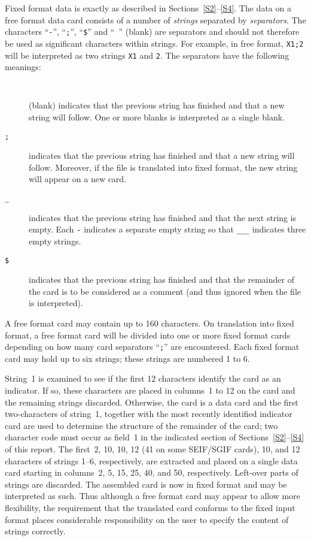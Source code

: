 \documentclass[a4paper]{article}
\newcommand{\itt}[1]{\item[\tt #1]}
\begin{document}
Fixed    format      data     is   exactly     as         described in
Sections~\ref{S2}--\ref{S4}.   The  data  on a free   format data card
consists of  a number of {\em  strings} separated by {\em separators}.
The characters  ``{\tt   -}'',  ``{\tt ;}'', ``{\tt   \$}'' and  ``~''
(blank)
are separators and should not therefore be used as significant
characters  within strings.  For example,  in  free format, {\tt X1;2}
will be interpreted   as two  strings {\tt X1}    and   {\tt 2}.   The
separators have the following meanings:
\begin{description}
\itt{~}
(blank) indicates that the previous string has finished and that a new
string will follow. One or  more blanks  is interpreted   as a  single
blank.

\itt{;}
indicates that the previous string has finished and  that a new string
will follow. Moreover, if the  file is translated  into  fixed format,
the new string will appear on a new card.

\itt{\_}
indicates that the  previous string  has finished  and  that the  next
string is empty.  Each {\tt  -}  indicates a separate empty string so
that {\tt \_\_\_} indicates three empty strings.

\itt{\$}
indicates that the previous string has finished and that the remainder
of the card is  to be considered as  a comment (and thus  ignored when
the file is interpreted).
\end{description}

A free format
card
may contain  up to 160  characters.  On translation  into  fixed
format,
a free format card will be divided into one or more fixed format
cards depending on  how many  card  separators ``{\tt ;}''
are encountered.  Each fixed format card may  hold up  to six strings;
these strings are numbered 1 to 6.

String~1  is examined to  see if the first 12  characters identify the
card as an indicator. If so, these characters are  placed in columns~1
to 12 on the card and the remaining  strings discarded. Otherwise, the
card is a data card and the first two-characters of string~1, together
with the most recently identified indicator card are used to determine
the structure
of the remainder of  the card;
two  character  code
must   occur   as    field~1   in  the  indicated section    of
Sections~\ref{S2}--\ref{S4} of this  report.  The first~2, 10, 10,  12
(41 on some SEIF/SGIF cards), 10, and  12 characters of  strings 1--6,
respectively, are extracted and placed on a single data  card starting
in columns~2, 5, 15, 25, 40, and 50, respectively.  Left-over parts of
strings are discarded. The assembled card is now in fixed format
and may be interpreted as such.  Thus although  a free format card may
appear to allow more flexibility, the  requirement that the translated
card
conforms  to  the  fixed  input   format
places considerable responsibility on  the user to specify the content
of strings correctly.
\end{document}
